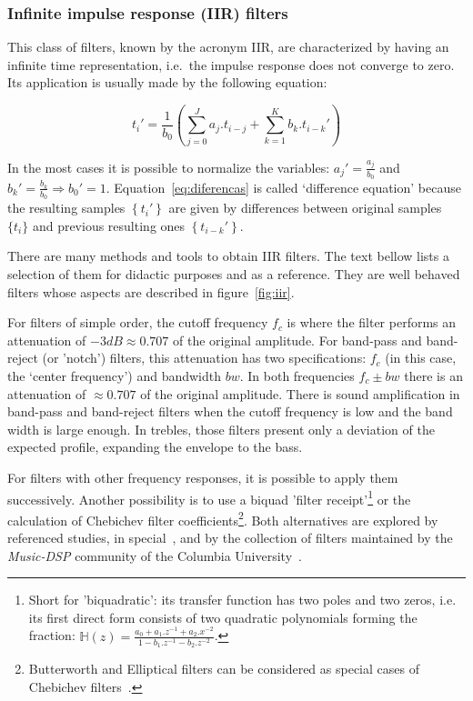 \documentclass[
 aip,
 jmp,
 amsmath,amssymb,
 reprint,
]{revtex4-1}
\begin{document}
\subsubsection{Infinite impulse response (IIR) filters}

This class of filters, known by the acronym IIR, are characterized by having an infinite time representation, i.e.\ the impulse response does not converge to zero. Its application is usually made by the following equation:

\begin{equation}\label{eq:diferencas}
 t_i' = \frac{1}{b_0}\left ( \sum_{j=0}^Ja_j . t_{i-j} + \sum_{k=1}^Kb_k . t_{i-k}' \right )
\end{equation}

In the most cases it is possible to normalize the variables: $a_j'=\frac{a_j}{b_0}$ and $b_k'=\frac{b_k}{b_0} \Rightarrow b_0' = 1$.
Equation~\ref{eq:diferencas} is called `difference equation' because the resulting samples $\left\{t_i'\right\}$ are given by differences between original samples $\{t_i\}$ and previous resulting ones $\left\{t_{i-k}'\right\}$.

There are many methods and tools to obtain IIR filters. The text bellow lists a selection of them for didactic purposes and as a reference. They are well behaved filters whose aspects are described in figure~\ref{fig:iir}.

For filters of simple order, the cutoff frequency $f_c$ is where the filter performs an attenuation of $-3dB \approx 0.707 $ of the original amplitude.
For band-pass and band-reject (or 'notch') filters, this attenuation has two specifications: $f_c$ (in this case, the `center frequency') and bandwidth $bw$.
In both frequencies $f_c \pm bw$ there is an attenuation of $\approx 0.707$ of the original amplitude.
There is sound amplification in band-pass and band-reject filters when the cutoff frequency is low and the band width is large enough. In trebles, those filters present only a deviation of the expected profile, expanding the envelope to the bass.

For filters with other frequency responses, it is possible to apply them successively. Another possibility is to use a biquad 'filter receipt'\footnote{Short for 'biquadratic': its transfer function has two poles and two zeros, i.e. its first direct form consists of two quadratic polynomials forming the fraction: $\mathbb{H}(z)=\frac{a_0+a_1.z^{-1}+a_2.x^{-2}}{1- b_1.z^{-1} -b_2 . z^{-2}}$.} or the calculation of Chebichev filter coefficients\footnote{Butterworth and Elliptical filters can be considered as special cases of Chebichev filters~\cite{Openheim,smith}.}.
Both alternatives are explored by referenced studies, in special~\cite{JOSFM,smith}, and by the collection of filters maintained by the \emph{Music-DSP} community of the Columbia University~\cite{music-dsp,Openheim}.
\end{document}
